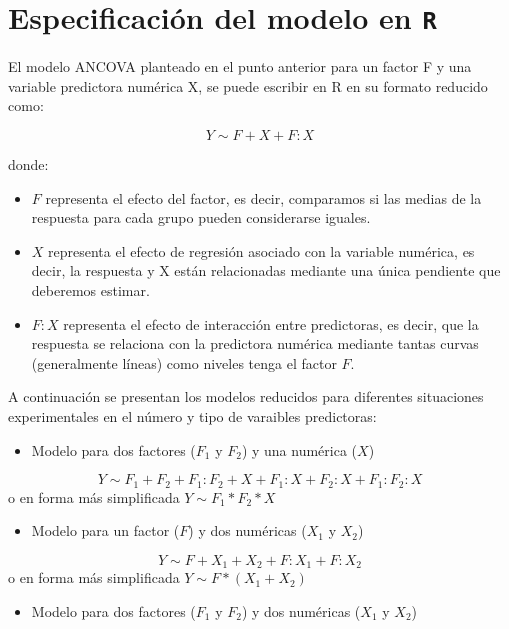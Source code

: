 \documentclass[
]{book}
\providecommand{\tightlist}{%
  \setlength{\itemsep}{0pt}\setlength{\parskip}{0pt}}
\theoremstyle{definition}
\theoremstyle{definition}
\theoremstyle{definition}
\theoremstyle{remark}
\begin{document}
\hypertarget{especificaciuxf3n-del-modelo-en-r}{%
\section{\texorpdfstring{Especificación del modelo en \texttt{R}}{Especificación del modelo en R}}\label{especificaciuxf3n-del-modelo-en-r}}

El modelo ANCOVA planteado en el punto anterior para un factor F y una variable predictora numérica X, se puede escribir en R en su formato reducido como:

\[Y \sim F + X + F:X\]

donde:

\begin{itemize}
\tightlist
\item
  \(F\) representa el efecto del factor, es decir, comparamos si las medias de la respuesta para cada grupo pueden considerarse iguales.
\item
  \(X\) representa el efecto de regresión asociado con la variable numérica, es decir, la respuesta y X están relacionadas mediante una única pendiente que deberemos estimar.
\item
  \(F:X\) representa el efecto de interacción entre predictoras, es decir, que la respuesta se relaciona con la predictora numérica mediante tantas curvas (generalmente líneas) como niveles tenga el factor \(F\).
\end{itemize}

A continuación se presentan los modelos reducidos para diferentes situaciones experimentales en el número y tipo de varaibles predictoras:

\begin{itemize}
\tightlist
\item
  Modelo para dos factores (\(F_1\) y \(F_2\)) y una numérica (\(X\))
\end{itemize}

\[Y \sim F_1 + F_2 + F_1:F_2 + X + F_1:X + F_2:X + F_1:F_2:X\]
o en forma más simplificada \(Y \sim F_1*F_2*X\)

\begin{itemize}
\tightlist
\item
  Modelo para un factor (\(F\)) y dos numéricas (\(X_1\) y \(X_2\))
\end{itemize}

\[Y \sim F + X_1 + X_2 + F:X_1 + F:X_2\]
o en forma más simplificada \(Y \sim F*(X_1 + X_2)\)

\begin{itemize}
\tightlist
\item
  Modelo para dos factores (\(F_1\) y \(F_2\)) y dos numéricas (\(X_1\) y \(X_2\))
\end{itemize}
\end{document}
